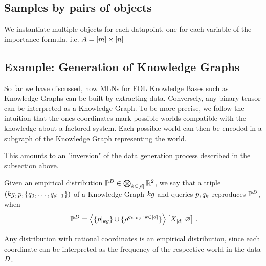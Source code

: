 \subsection{Samples by pairs of objects}

We instantiate multiple objects for each datapoint, one for each variable of the importance formula, i.e. $A=[m]\times[n]$



\subsection{Example: Generation of Knowledge Graphs} %

So far we have discussed, how MLNs for FOL Knowledge Bases such as Knowledge Graphs can be built by extracting data.
Conversely, any binary tensor can be interpreted as a Knowledge Graph.
To be more precise, we follow the intuition that the ones coordinates mark possible worlds compatible with the knowledge about a factored system.
Each possible world can then be encoded in a subgraph of the Knowledge Graph representing the world.

%
This amounts to an "inversion" of the data generation process described in the subsection above.

%


\begin{definition}
	Given an empirical distribution $\mathbb{P}^{D}\in\bigotimes_{k\in[d]}\mathbb{R}^2$, we say that a triple $(kg,p,\{q_{0},\ldots,q_{d-1}\})$ of a Knowledge Graph $kg$ and queries $p,q_{k}$ reproduces $\mathbb{P}^{D}$, when 
		\[ \empdistribution = \normationof{\{\kggroundingof{\impformula}\}\cup\{\rencodingof{\kggroundingof{\extformulaof{\atomenumerator}}\, : \, \atomenumeratorin}\}}{\shortcatvariables} \, .  \]
\end{definition}

%
Any distribution with rational coordinates is an empirical distribution, since each coordinate can be interpreted as the frequency of the respective world in the data $D$.



